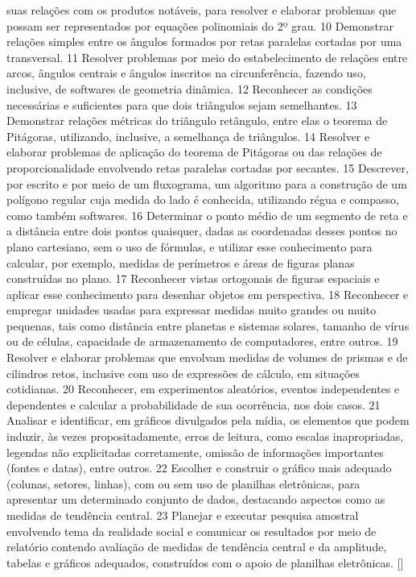 {{{{{							suas relações com os produtos notáveis, para resolver e elaborar problemas que possam ser
							representados por equações polinomiais do 2º grau.
						}
						{10}{%
							Demonstrar relações simples entre os ângulos formados por retas paralelas
							cortadas por uma transversal.
						}
						{11}{%
							Resolver problemas por meio do estabelecimento de relações entre arcos,
							ângulos centrais e ângulos inscritos na circunferência, fazendo uso, inclusive, de softwares de
							geometria dinâmica.
						}
						{12}{%
							Reconhecer as condições necessárias e suficientes para que dois triângulos
							sejam semelhantes.
						}
						{13}{%
							Demonstrar relações métricas do triângulo retângulo, entre elas o teorema de
							Pitágoras, utilizando, inclusive, a semelhança de triângulos.
						}
						{14}{%
							Resolver e elaborar problemas de aplicação do teorema de Pitágoras ou das
							relações de proporcionalidade envolvendo retas paralelas cortadas por secantes.
						}
						{15}{%
							Descrever, por escrito e por meio de um fluxograma, um algoritmo para a
							construção de um polígono regular cuja medida do lado é conhecida, utilizando régua e
							compasso, como também softwares.
						}
						{16}{%
							Determinar o ponto médio de um segmento de reta e a distância entre dois pontos
							quaisquer, dadas as coordenadas desses pontos no plano cartesiano, sem o uso de fórmulas, e
							utilizar esse conhecimento para calcular, por exemplo, medidas de perímetros e áreas de figuras
							planas construídas no plano.
						}
						{17}{%
							Reconhecer vistas ortogonais de figuras espaciais e aplicar esse conhecimento
							para desenhar objetos em perspectiva.
						}
						{18}{%
							Reconhecer e empregar unidades usadas para expressar medidas muito grandes
							ou muito pequenas, tais como distância entre planetas e sistemas solares, tamanho de vírus ou
							de células, capacidade de armazenamento de computadores, entre outros.
						}
						{19}{%
							Resolver e elaborar problemas que envolvam medidas de volumes de prismas e
							de cilindros retos, inclusive com uso de expressões de cálculo, em situações cotidianas.
						}
						{20}{%
							Reconhecer, em experimentos aleatórios, eventos independentes e dependentes
							e calcular a probabilidade de sua ocorrência, nos dois casos.
						}
						{21}{%
							Analisar e identificar, em gráficos divulgados pela mídia, os elementos que
							podem induzir, às vezes propositadamente, erros de leitura, como escalas inapropriadas,
							legendas não explicitadas corretamente, omissão de informações importantes (fontes e
							datas), entre outros.
						}
						{22}{%
							Escolher e construir o gráfico mais adequado (colunas, setores, linhas), com
							ou sem uso de planilhas eletrônicas, para apresentar um determinado conjunto de dados,
							destacando aspectos como as medidas de tendência central.
						}
						{23}{%
							Planejar e executar pesquisa amostral envolvendo tema da realidade social e
							comunicar os resultados por meio de relatório contendo avaliação de medidas de tendência central
							e da amplitude, tabelas e gráficos adequados, construídos com o apoio de planilhas eletrônicas.
						}
				}
			}
	}[\la@invalidefhability]
}
